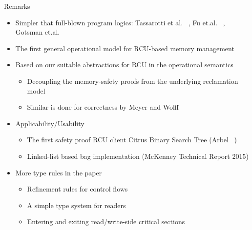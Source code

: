 \documentclass[aspectratio=169,xcolor=dvipsnames]{beamer}
\begin{document}
\begin{frame}{Remarks}
    \begin{itemize}
        \item Simpler that full-blown program logics: Tassarotti et al. ~\cite{}, Fu et.al. ~\cite{}, Gotsman et.al. ~\cite{}
        \item The first general operational model for RCU-based memory management
        \item Based on our suitable abstractions for RCU in the operational semantics 
        \begin{itemize}
            \item Decoupling the memory-safety proofs from the underlying reclamation model
            \item Similar is done for correctness by Meyer and Wolff ~\cite{}
        \end{itemize}
        \item Applicability/Usability
        \begin{itemize}
            \item The first safety proof RCU client Citrus Binary Search Tree (Arbel ~\cite{})
            \item Linked-list based bag implementation (McKenney Technical Report 2015)
        \end{itemize}
        \item More type rules in the paper
        \begin{itemize}
            \item Refinement rules for control flows 
            \item A simple type system for readers
            \item Entering and exiting read/write-side critical sections
        \end{itemize}
    \end{itemize}
\end{frame}
\end{document}
